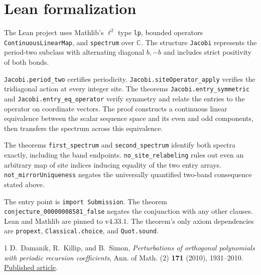 \documentclass[11pt]{article}
\begin{document}
\clearpage
\section{Lean formalization}

\begingroup\raggedright
The Lean project uses Mathlib's $\ell^2$ type \texttt{lp},
bounded operators \texttt{ContinuousLinearMap}, and
\texttt{spectrum} over $\mathbb C$. The structure \texttt{Jacobi}
represents the period-two subclass with alternating diagonal
$b,-b$ and includes strict positivity of both bonds.

\texttt{Jacobi.period\_two} certifies periodicity.
\texttt{Jacobi.siteOperator\_apply} verifies the tridiagonal action
at every integer site. The theorems \texttt{Jacobi.entry\_symmetric}
and \texttt{Jacobi.entry\_eq\_operator} verify symmetry and relate
the entries to the operator on coordinate vectors. The proof constructs
a continuous linear equivalence between the scalar sequence space and
its even and odd components, then transfers the spectrum across
this equivalence.

The theorems \texttt{first\_spectrum} and \texttt{second\_spectrum}
identify both spectra exactly, including the band endpoints.
\texttt{no\_site\_relabeling} rules out even an arbitrary map
of site indices inducing equality of the two entry arrays.
\texttt{not\_mirrorUniqueness} negates the universally quantified
two-band consequence stated above.

The entry point is \texttt{import Submission}. The theorem
\texttt{conjecture\_00000008581\_false} negates the conjunction with
any other clauses. Lean and Mathlib are pinned to v4.33.1. The
theorem's only axiom dependencies are \texttt{propext},
\texttt{Classical.choice}, and \texttt{Quot.sound}.

\par
\endgroup
\begin{thebibliography}{1}
D.~Damanik, R.~Killip, and B.~Simon,
\emph{Perturbations of orthogonal polynomials with periodic recursion
coefficients}, Ann. of Math. (2) \textbf{171} (2010), 1931--2010.
\href{https://annals.math.princeton.edu/wp-content/uploads/annals-v171-n3-p11-p.pdf}{Published article}.
\end{thebibliography}
\end{document}
